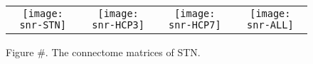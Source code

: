 \documentclass{article}
\begin{document}
\begin{figure}[h]
  \hspace*{-3.0cm}
  \begin{tabular}{cccc}
    \texttt{[image: snr-STN]} &   
    \texttt{[image: snr-HCP3]} &   
    \texttt{[image: snr-HCP7]} &   
    \texttt{[image: snr-ALL]}

  \end{tabular}
  \caption{Figure \#. The connectome matrices of STN.}
\end{figure}
\end{document}
